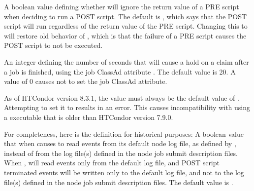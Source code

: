 \begin{description}
\label{param:DAGmanAlwaysRunPost}
\item[\Macro{DAGMAN\_ALWAYS\_RUN\_POST}]
  A boolean value defining whether  will ignore the return value
  of a PRE script when deciding to run a POST script.  The default is
  , which says that the POST script will run regardless of the return
  value of the PRE script. Changing this to  will restore old
  behavior of , which is that the failure of a PRE script causes
  the POST script to not be executed.

\label{param:DAGmanHoldClaimTime}
\item[\Macro{DAGMAN\_HOLD\_CLAIM\_TIME}]
  An integer defining the number of seconds that  will cause a
  hold on a claim after a job is finished, 
  using the job ClassAd attribute .
  The default value is 20. 
  A value of 0 causes  not to set the job ClassAd attribute.

\label{param:DAGmanAlwaysUseNodeLog}
\item[\Macro{DAGMAN\_ALWAYS\_USE\_NODE\_LOG}]
  As of HTCondor version 8.3.1, the value must always be the default 
  value of .  
  Attempting to set it to  results in an error. 
  This causes incompatibility with using a  executable 
  that is older than HTCondor version 7.9.0.

  For completeness, here is the definition for historical purposes: 
  A boolean value that when   causes  to read
  events from its default node log file, as defined by
  , instead of from the log file(s)
  defined in the node job submit description files.
  When ,
   will read events only from the default log
  file, and POST script terminated events will
  be written only to the default log file, and not to the
  log file(s) defined in the node job submit description files.
  The default value is .


\end{description}

